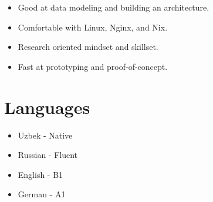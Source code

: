\documentclass[a4paper,12pt]{article}
\begin{document}
\begin{itemize} \setlength{\itemsep}{1pt} \setlength{\parskip}{1pt}
  \item Good at data modeling and building an architecture.
  \item Comfortable with Linux, Nginx, and Nix.
  \item Research oriented mindset and skillset.
  \item Fast at prototyping and proof-of-concept.
\end{itemize}

\section*{Languages}

\begin{itemize} \setlength{\itemsep}{1pt} \setlength{\parskip}{1pt}
  \item Uzbek - Native
  \item Russian - Fluent
  \item English - B1
  \item German - A1
\end{itemize}
\end{document}
